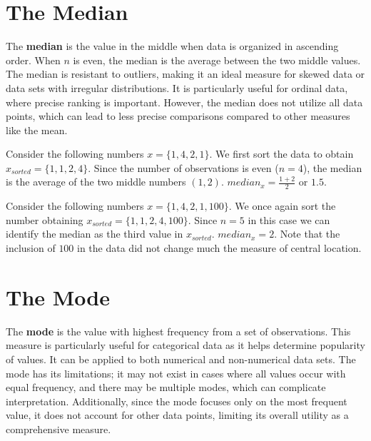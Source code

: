\documentclass[
  11pt,
  letterpaper,
  DIV=11,
  numbers=noendperiod,
  oneside,
  open=any]{scrreprt}
\begin{document}
\section{The Median}\label{the-median}

The \textbf{median} is the value in the middle when data is organized in
ascending order. When \(n\) is even, the median is the average between
the two middle values. The median is resistant to outliers, making it an
ideal measure for skewed data or data sets with irregular distributions.
It is particularly useful for ordinal data, where precise ranking is
important. However, the median does not utilize all data points, which
can lead to less precise comparisons compared to other measures like the
mean.

\begin{bsexample}[Example 1]

Consider the following numbers \(x=\{1,4,2,1\}\). We first sort the data
to obtain \(x_{sorted}=\{1,1,2,4\}\). Since the number of observations
is even (\(n=4\)), the median is the average of the two middle numbers
\((1,2)\). \(median_x=\frac{1+2}{2}\) or \(1.5\).

\end{bsexample}

\begin{bsexample}[Example 2]

Consider the following numbers \(x=\{1,4,2,1,100\}\). We once again sort
the number obtaining \(x_{sorted}=\{1,1,2,4,100\}\). Since \(n=5\) in
this case we can identify the median as the third value in
\(x_{sorted}\). \(median_x=2\). Note that the inclusion of \(100\) in
the data did not change much the measure of central location.

\end{bsexample}

\section{The Mode}\label{the-mode}

The \textbf{mode} is the value with highest frequency from a set of
observations. This measure is particularly useful for categorical data
as it helps determine popularity of values. It can be applied to both
numerical and non-numerical data sets. The mode has its limitations; it
may not exist in cases where all values occur with equal frequency, and
there may be multiple modes, which can complicate interpretation.
Additionally, since the mode focuses only on the most frequent value, it
does not account for other data points, limiting its overall utility as
a comprehensive measure.
\end{document}
